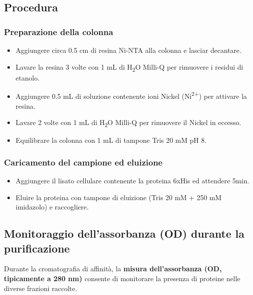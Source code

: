 \subsection{Procedura}
\subsubsection*{Preparazione della colonna}
\begin{itemize}\footnotesize
  \item Aggiungere circa 0.5 cm di resina Ni-NTA alla colonna e lasciar decantare.
  \item Lavare la resina 3 volte con 1 mL di H\textsubscript{2}O Milli-Q per rimuovere i residui di etanolo.
  \item Aggiungere 0.5 mL di soluzione contenente ioni Nickel (Ni\textsuperscript{2+}) per attivare la resina.
  \item Lavare 2 volte con 1 mL di H\textsubscript{2}O Milli-Q per rimuovere il Nickel in eccesso.
  \item Equilibrare la colonna con 1 mL di tampone Tris 20 mM pH 8.
\end{itemize}

\subsubsection*{Caricamento del campione ed eluizione}
\begin{itemize}\footnotesize
  \item Aggiungere il lisato cellulare contenente la proteina 6xHis ed attendere 5min.
  \item Eluire la proteina con tampone di eluizione (Tris 20 mM + 250 mM imidazolo) e raccogliere.
\end{itemize}

\subsection{Monitoraggio dell’assorbanza (OD) durante la purificazione}

Durante la cromatografia di affinità, la \textbf{misura dell’assorbanza (OD, tipicamente a 280 nm)} consente di monitorare la presenza di proteine nelle diverse frazioni raccolte.

